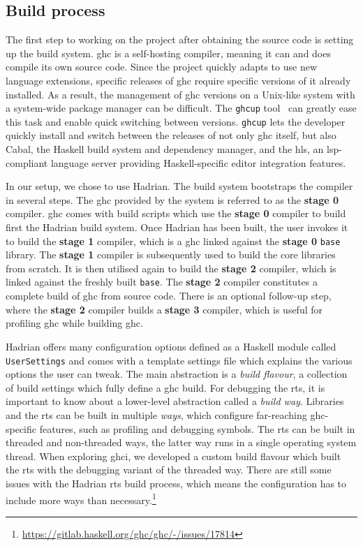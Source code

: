 \documentclass[thesis=B,english]{FITthesis}[2019/12/23]
\newcommand{\hackage}[1]{\texttt{#1}}
\newcommand{\hsModule}[1]{\texttt{#1}}
\begin{document}
\subsection*{Build process}
The first step to working on the project after obtaining the source code is
setting up the build system. \acrshort{ghc} is a self-hosting compiler, meaning
it can and does compile its own source code. Since the project quickly adapts
to use new language extensions, specific releases of \acrshort{ghc} require
specific versions of it already installed. As a result, the management of
\acrshort{ghc} versions on a Unix-like system with a system-wide package
manager can be difficult. The \texttt{ghcup} tool~\cite{ghcup} can greatly ease
this task and enable quick switching between versions. \texttt{ghcup} lets the
developer quickly install and switch between the releases of not only
\acrshort{ghc} itself, but also Cabal, the Haskell build system and dependency
manager, and the \acrfull{hls}, an \acrshort{lsp}-compliant language server
providing Haskell-specific editor integration features.

In our setup, we chose to use Hadrian. The build system bootstraps the compiler
in several steps. The \acrshort{ghc} provided by the system is referred to as
the \textbf{stage 0} compiler. \acrshort{ghc} comes with build scripts which
use the \textbf{stage 0} compiler to build first the Hadrian build system. Once
Hadrian has been built, the user invokes it to build the \textbf{stage 1}
compiler, which is a \acrshort{ghc} linked against the \textbf{stage 0}
\hackage{base} library. The \textbf{stage 1} compiler is subsequently used to
build the core libraries from scratch. It is then utilised again to build the
\textbf{stage 2} compiler, which is linked against the freshly built
\hackage{base}. The \textbf{stage 2} compiler constitutes a complete build of
\acrshort{ghc} from source code. There is an optional follow-up step, where the
\textbf{stage 2} compiler builds a \textbf{stage 3} compiler, which is useful
for profiling \acrshort{ghc} while building \acrshort{ghc}.

Hadrian offers many configuration options defined as a Haskell module called
\hsModule{UserSettings} and comes with a template settings file which explains
the various options the user can tweak. The main abstraction is a \textit{build
flavour}, a collection of build settings which fully define a \acrshort{ghc}
build. For debugging the \acrshort{rts}, it is important to know about a
lower-level abstraction called a \textit{build way}. Libraries and the
\acrshort{rts} can be built in multiple \textit{ways}, which configure
far-reaching \acrshort{ghc}-specific features, such as profiling and debugging
symbols. The \acrshort{rts} can be built in threaded and non-threaded ways, the
latter way runs in a single operating system thread. When exploring
\acrshort{ghci}, we developed a custom build flavour which built the
\acrshort{rts} with the debugging variant of the threaded way. There are still
some issues with the Hadrian \acrshort{rts} build process, which means the
configuration has to include more ways than necessary.\footnote{
	\url{https://gitlab.haskell.org/ghc/ghc/-/issues/17814}
}
\end{document}
